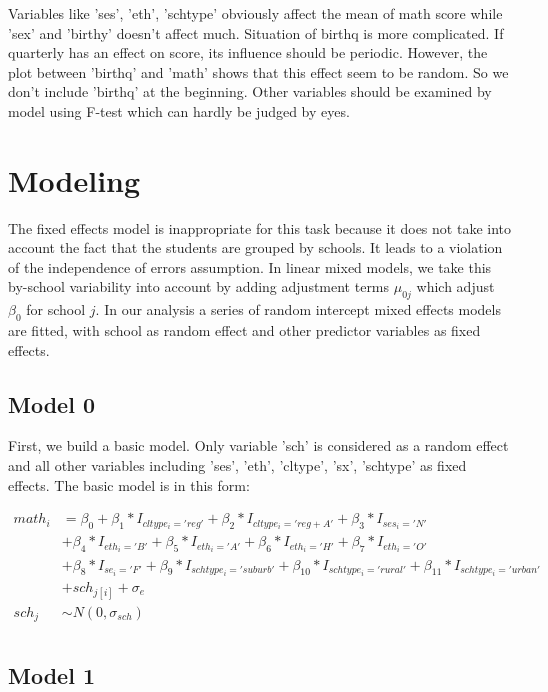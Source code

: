 \documentclass[11pt,a4paper]{article}
\begin{document}
Variables like 'ses', 'eth', 'schtype' obviously affect the mean of math score while 'sex' and 'birthy' doesn’t affect much. 
Situation of birthq is more complicated. If quarterly has an effect on score, its influence should be periodic. 
However, the plot between 'birthq' and 'math' shows that this effect seem to be random. So we don't include 'birthq' at the beginning.
Other variables should be examined by model using F-test which can hardly be judged by eyes.

\section{Modeling}

The fixed effects model is inappropriate for this task because it does not take into account the fact that the students are grouped 
by schools. It leads to a violation of the independence of errors assumption. In linear mixed models, we take this by-school 
variability into account by adding adjustment terms $\mu_{0j}$ which adjust $\beta_0$ for school $j$. In our analysis a series of random intercept 
mixed effects models are fitted, with school as random effect and other predictor variables as fixed effects. 

\subsection{Model 0}



First, we build a basic model. Only variable 'sch' is considered as a random effect and all other variables including 'ses', 'eth', 
'cltype', 'sx', 'schtype' as fixed effects. The basic model is in this form:

\begin{align*}
    math_i 
    &= \beta_0 + \beta_1*I_{cltype_i='reg'} + \beta_2*I_{cltype_i='reg+A'} + \beta_3*I_{ses_i='N'} \\
    &+ \beta_4*I_{eth_i='B'} + \beta_5*I_{eth_i='A'} + \beta_6*I_{eth_i='H'} + \beta_7*I_{eth_i='O'} \\
    &+ \beta_8*I_{se_i='F'} + \beta_9*I_{schtype_i='suburb'} + \beta_{10}*I_{schtype_i='rural'} + \beta_{11}*I_{schtype_i='urban'}\\
    &+ sch_{j[i]} + \sigma_e\\
    sch_j &\sim N(0, \sigma_{sch})\\
\end{align*}

\subsection{Model 1}
\end{document}
